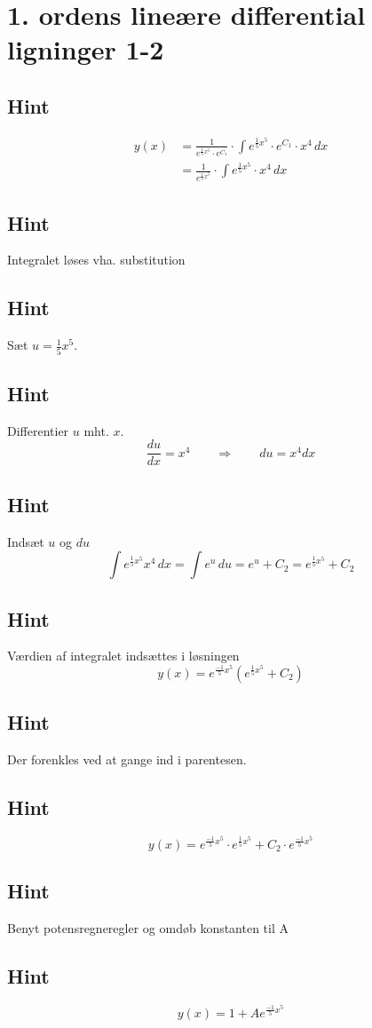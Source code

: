 \documentclass{article}
\newenvironment{exercise}[1]{\newpage\section{#1}}{}
\newcommand{\hint}{\subsection*{Hint}}
\begin{document}
\begin{exercise}{1. ordens lineære differential ligninger 1-2}
	\hint
	\begin{align*}
	y(x) &= \frac{1}{e^{\frac{1}{5}x^5} \cdot e^{C_1}} \cdot \int e^{\frac{1}{5}x^5} \cdot e^{C_1}  \cdot x^4 \, dx  \\
	&= \frac{1}{e^{\frac{1}{5}x^5}} \cdot \int e^{\frac{1}{5}x^5}  \cdot x^4 \, dx
	\end{align*}
	
	\hint
	
	Integralet løses vha. substitution
	
	
	\hint
	Sæt $u = \frac{1}{5}x^5$.
	
	\hint
	
	Differentier $u$ mht. $x$.
	\[
	\frac{du}{dx} = x^4 \qquad	\Rightarrow \qquad du = x^4 dx
	\]
	
	\hint 
	Indsæt $u$ og $du$
	\[
	\int e^{\frac{1}{5}x^5}x^4 \, dx = \int e^{u} \, du = e^{u} + C_2 = e^{\frac{1}{5}x^5} + C_2
	\]
	
	\hint
	
	Værdien af integralet indsættes i løsningen
	\[
	y(x) = e^{\frac{-1}{5}x^5} \left( e^{\frac{1}{5}x^5}+ C_2\right)
	\]
	
	\hint
	
	Der forenkles ved at gange ind i parentesen.
	
	\hint
	\[
	y(x) = e^{\frac{-1}{5}x^5} \cdot e^{\frac{1}{5}x^5} + C_2 \cdot e^{\frac{-1}{5}x^5} 
	\]
	
	\hint
	
	Benyt potensregneregler og omdøb konstanten til A
	
	\hint
	\[
	y(x) = 1 + A e^{\frac{-1}{5}x^5}
	\]
	
	
\end{exercise}

\newpage
\end{document}
